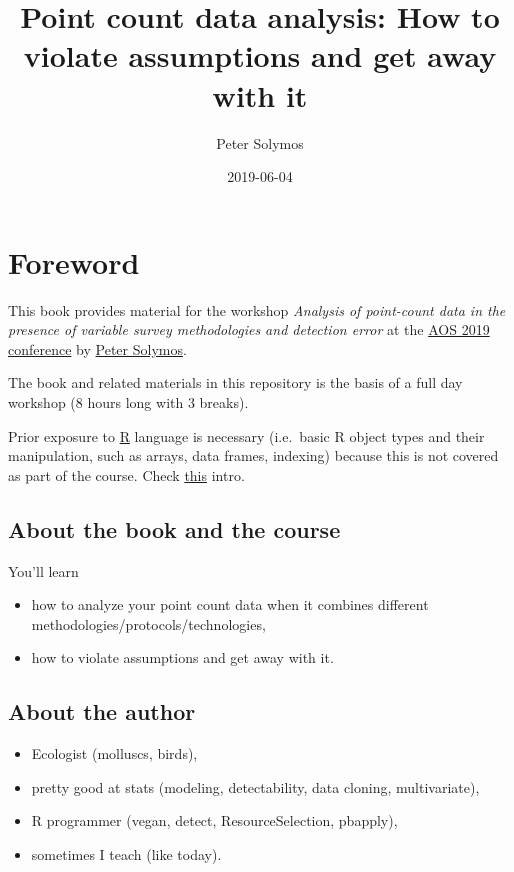 \documentclass[12pt,]{book}
\title{Point count data analysis: How to violate assumptions and get away with it}
\author{Peter Solymos}
\date{2019-06-04}
\providecommand{\tightlist}{%
  \setlength{\itemsep}{0pt}\setlength{\parskip}{0pt}}
\begin{document}
\maketitle

{
\setcounter{tocdepth}{1}
\tableofcontents
}
\hypertarget{foreword}{%
\chapter{Foreword}\label{foreword}}

This book provides material for the workshop
\emph{Analysis of point-count data in the presence of variable survey methodologies and detection error}
at the \href{https://amornithmeeting.org/}{AOS 2019 conference}
by \href{http://peter.solymos.org}{Peter Solymos}.

The book and related materials in this repository is the basis of a
full day workshop (8 hours long with 3 breaks).

Prior exposure to \href{https://www.r-project.org/}{R} language is necessary
(i.e.~basic R object types and their manipulation, such as arrays, data frames, indexing)
because this is not covered as part of the course.
Check \href{_etc/R-basics.pdf}{this} intro.

\hypertarget{about-the-book-and-the-course}{%
\section{About the book and the course}\label{about-the-book-and-the-course}}

You'll learn

\begin{itemize}
\tightlist
\item
  how to analyze your point count data when it combines different methodologies/protocols/technologies,
\item
  how to violate assumptions and get away with it.
\end{itemize}

\hypertarget{about-the-author}{%
\section{About the author}\label{about-the-author}}

\begin{itemize}
\tightlist
\item
  Ecologist (molluscs, birds),
\item
  pretty good at stats (modeling, detectability, data cloning, multivariate),
\item
  R programmer (vegan, detect, ResourceSelection, pbapply),
\item
  sometimes I teach (like today).
\end{itemize}
\end{document}
